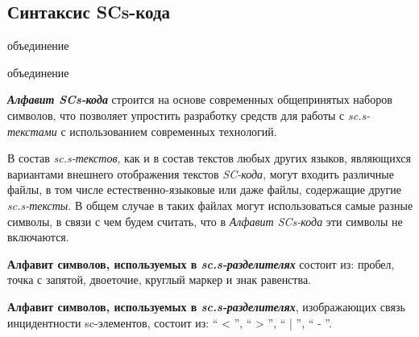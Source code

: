 \subsection{Синтаксис SCs-кода}
\label{sec_scs_syntax}

\begin{SCn}
	\begin{scnreltoset}{объединение}
		\begin{scnindent}
			\begin{scnreltoset}{объединение}
			\end{scnreltoset}
		\end{scnindent}
	\end{scnreltoset}
\end{SCn} 

\textbf{\textit{Алфавит SCs-кода\scnsupergroupsign}} строится на основе современных общепринятых наборов символов, что позволяет упростить разработку средств для работы с \textit{sc.s-текстами} с использованием современных технологий.

В состав \textit{sc.s-текстов}, как и в состав текстов любых других языков, являющихся вариантами внешнего отображения текстов \textit{SC-кода}, могут входить различные файлы, в том числе естественно-языковые или даже файлы, содержащие другие \textit{sc.s-тексты}. В общем случае в таких файлах могут использоваться самые разные символы, в связи с чем будем считать, что в \textit{Алфавит SCs-кода\scnsupergroupsign} эти символы не включаются.

\textbf{Алфавит символов, используемых в \textit{sc.s-разделителях}\scnsupergroupsign} состоит из: пробел, точка с запятой, двоеточие, круглый маркер и знак равенства.

\textbf{Алфавит символов, используемых в \textit{sc.s-разделителях}\scnsupergroupsign}, изображающих связь инцидентности sc-элементов, состоит из: `` < ''{}, `` > ''{}, `` | ''{}, `` - ''{}.

